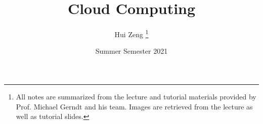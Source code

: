 \title{Cloud Computing}
\author{Hui Zeng \thanks{All notes are summarized from the lecture and tutorial materials provided by Prof. Michael Gerndt and his team. Images are retrieved from the lecture as well as tutorial slides.}}
\date{Summer Semester 2021}
\maketitle

\newpage